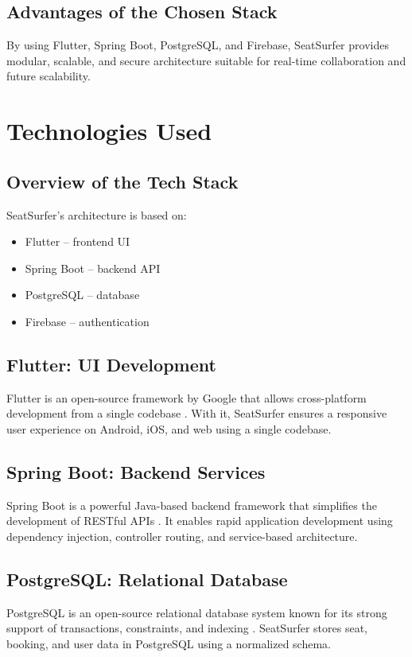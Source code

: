 \documentclass[12pt,a4paper]{report}
\begin{document}
\section{Advantages of the Chosen Stack}
By using Flutter, Spring Boot, PostgreSQL, and Firebase, SeatSurfer provides modular, scalable, and secure architecture suitable for real-time collaboration and future scalability.

\newpage

\chapter{Technologies Used}

\section{Overview of the Tech Stack}
SeatSurfer’s architecture is based on:
\begin{itemize}
    \item Flutter – frontend UI
    \item Spring Boot – backend API
    \item PostgreSQL – database
    \item Firebase – authentication
\end{itemize}

\section{Flutter: UI Development}
Flutter is an open-source framework by Google that allows cross-platform development from a single codebase \cite{flutter}. With it, SeatSurfer ensures a responsive user experience on Android, iOS, and web using a single codebase.

\section{Spring Boot: Backend Services}
Spring Boot is a powerful Java-based backend framework that simplifies the development of RESTful APIs \cite{springboot}. It enables rapid application development using dependency injection, controller routing, and service-based architecture.

\section{PostgreSQL: Relational Database}
PostgreSQL is an open-source relational database system known for its strong support of transactions, constraints, and indexing \cite{postgresql}. SeatSurfer stores seat, booking, and user data in PostgreSQL using a normalized schema.
\end{document}
